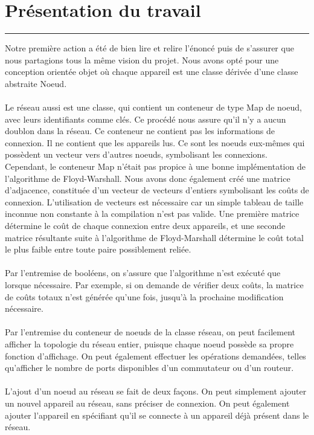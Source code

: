 \documentclass[10pt,letterpaper]{article}
\begin{document}
\section{Présentation du travail}
\hrule
\vspace{1em}
Notre première action a été de bien lire et relire l’énoncé puis de s’assurer que nous partagions tous la même vision du projet. 
Nous avons opté pour une conception orientée objet où chaque appareil est une classe dérivée d’une classe abstraite Noeud.\\
\\
Le réseau aussi est une classe, qui contient un conteneur de type Map de noeud, avec leurs identifiants comme clés. 
Ce procédé nous assure qu’il n’y a aucun doublon dans la réseau. 
Ce conteneur ne contient pas les informations de connexion. 
Il ne contient que les appareils lus. 
Ce sont les noeuds eux-mêmes qui possèdent un vecteur vers d’autres noeuds, symbolisant les connexions. 
Cependant, le conteneur Map n’était pas propice à une bonne implémentation de l’algorithme de Floyd-Warshall. 
Nous avons donc également créé une matrice d’adjacence, constituée d’un vecteur de vecteurs d’entiers symbolisant les coûts de connexion. 
L’utilisation de vecteurs est nécessaire car un simple tableau de taille inconnue non constante à la compilation n’est pas valide. 
Une première matrice détermine le coût de chaque connexion entre deux appareils, 
et une seconde matrice résultante suite à l’algorithme de Floyd-Marshall détermine le coût total le plus faible entre toute paire possiblement reliée.\\
\\
Par l’entremise de booléens, on s’assure que l’algorithme n’est exécuté que lorsque nécessaire. 
Par exemple, si on demande de vérifier deux coûts, la matrice de coûts totaux n’est générée qu’une fois, jusqu’à la prochaine modification nécessaire.\\
\\
Par l’entremise du conteneur de noeuds de la classe réseau, on peut facilement afficher la topologie du réseau entier, 
puisque chaque noeud possède sa propre fonction d’affichage. 
On peut également effectuer les opérations demandées, telles qu’afficher le nombre de ports disponibles d’un commutateur ou d’un routeur.\\
\\
L’ajout d’un noeud au réseau se fait de deux façons. 
On peut simplement ajouter un nouvel appareil au réseau, sans préciser de connexion. 
On peut également ajouter l’appareil en spécifiant qu’il se connecte à un appareil déjà présent dans le réseau. 
\end{document}
